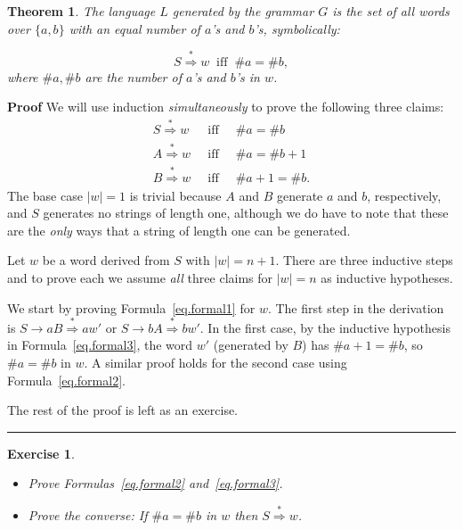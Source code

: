 \documentclass[11pt,a4paper]{report}
\newcommand*{\qed}{\hfill\rule{1ex}{1.5ex}}
\newtheorem{theorem}{Theorem}
\newtheorem{exercise}{Exercise}
\begin{document}
\begin{theorem}
The language $L$ generated by the grammar $G$
is the set of all words over $\{a,b\}$ with an equal number of $a$'s and
$b$'s, symbolically:

\begin{displaymath}
S \stackrel{*}{\Rightarrow} w \;\;\mathrm{iff}\;\; \#a = \#b,
\end{displaymath}
where $\#a,\#b$ are the number of $a$'s and $b$'s in $w$.
\end{theorem}

\textbf{Proof} We will use induction \emph{simultaneously} to prove the following three claims:
\begin{eqnarray}
S \stackrel{*}{\Rightarrow} w &\;\;\mathrm{iff}\;\;& \#a = \#b\label{eq.formal1}\\
A \stackrel{*}{\Rightarrow} w &\;\;\mathrm{iff}\;\;& \#a = \#b+1\label{eq.formal2}\\
B \stackrel{*}{\Rightarrow} w &\;\;\mathrm{iff}\;\;& \#a+1 = \#b.\label{eq.formal3}
\end{eqnarray}
The base case $|w|=1$ is trivial because $A$ and $B$ generate
$a$ and $b$, respectively, and $S$ generates no strings of length one,
although we do have to note that these are the \emph{only} ways that a
string of length one can be generated.

Let $w$ be a word derived from $S$ with $|w|=n+1$. There are three inductive steps and to prove each we assume \emph{all} three claims for $|w|=n$ as inductive hypotheses. 

We start by proving Formula~\ref{eq.formal1} for $w$. The first step in the derivation is $S\rightarrow aB \stackrel{*}{\Rightarrow} aw'$ or $S\rightarrow bA\stackrel{*}{\Rightarrow} bw'$. In the first case, by the inductive hypothesis in Formula~\ref{eq.formal3}, the word $w'$ (generated by $B$) has $\#a+1=\#b$, so $\#a=\#b$ in $w$. A similar proof holds for the second case using Formula~\ref{eq.formal2}.

The rest of the proof is left as an exercise.\qed

\begin{exercise}\mbox{}
\begin{itemize}
\item Prove Formulas~\ref{eq.formal2} and~\ref{eq.formal3}.
\item Prove the converse: If $\#a=\#b$ in $w$ then $S \stackrel{*}{\Rightarrow} w$.
\end{itemize}
\end{exercise}
\end{document}
